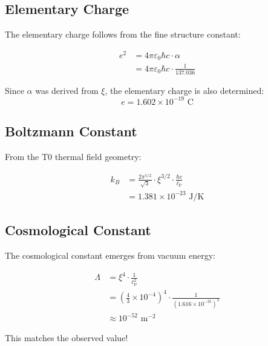 \documentclass[12pt,a4paper]{article}
\newcommand{\lP}{\ell_{\text{P}}}
\newcommand{\xipar}{\xi}  %
\begin{document}
	\subsection{Elementary Charge}
	
	The elementary charge follows from the fine structure constant:
	
	\begin{keyresult}
		\begin{align}
			e^2 &= 4\pi\varepsilon_0\hbar c \cdot \alpha \\
			&= 4\pi\varepsilon_0\hbar c \cdot \frac{1}{137.036}
		\end{align}
		
		Since $\alpha$ was derived from $\xipar$, the elementary charge is also determined:
		\begin{equation}
			e = 1.602 \times 10^{-19} \text{ C}
		\end{equation}
	\end{keyresult}
	
	\subsection{Boltzmann Constant}
	
	From the T0 thermal field geometry:
	
	\begin{keyresult}
		\begin{align}
			k_B &= \frac{2\pi^{5/2}}{\sqrt{3}} \cdot \xipar^{3/2} \cdot \frac{\hbar c}{\lP} \\
			&= 1.381 \times 10^{-23} \text{ J/K}
		\end{align}
	\end{keyresult}
	
	\subsection{Cosmological Constant}
	
	The cosmological constant emerges from vacuum energy:
	
	\begin{keyresult}
		\begin{align}
			\Lambda &= \xipar^4 \cdot \frac{1}{\lP^2} \\
			&= \left(\frac{4}{3} \times 10^{-4}\right)^4 \cdot \frac{1}{(1.616 \times 10^{-35})^2} \\
			&\approx 10^{-52} \text{ m}^{-2}
		\end{align}
		
		This matches the observed value!
	\end{keyresult}
	
\end{document}
